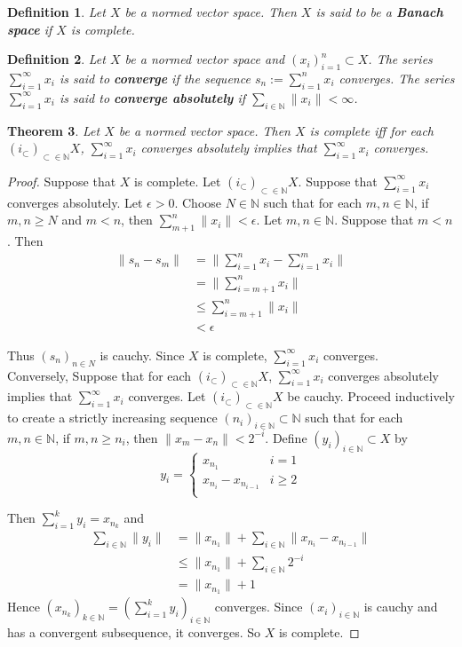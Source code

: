 \documentclass[12pt]{amsart}
\newtheorem{thm}{Theorem}[subsection]
\newtheorem{defn}[thm]{Definition}
\newcommand{\ep}{\epsilon}
\newcommand{\N}{\mathbb{N}}
\newcommand{\seq}[2]{(#1_{#2})_{#2 \in \N}}
\begin{document}
	\begin{defn}
		Let $X$ be a normed vector space. Then $X$ is said to be a \textbf{Banach space} if $X$ is complete.  
	\end{defn}
	
	\begin{defn}
		Let $X$ be a normed vector space and $(x_i)_{i=1}^n \subset X$. The series $\sum_{i =1}^{\infty}x_i$ is said to \textbf{converge} if the sequence $s_n := \sum_{i=1}^n x_i$ converges. The series $\sum_{i =1}^{\infty}x_i$ is said to \textbf{converge absolutely} if $\sum_{i\in \N}\|x_i \|< \infty$.
	\end{defn}
	
	\begin{thm}
		Let $X$ be a normed vector space. Then $X$ is complete iff for each $\seq{i} \subset X$, $\sum_{i =1}^{\infty}x_i$ converges absolutely implies that $\sum_{i=1}^{\infty}x_i$ converges. 
	\end{thm}
	
	\begin{proof}
		Suppose that $X$ is complete. Let $\seq{i} \subset X$. Suppose that $\sum_{i=1}^{\infty}x_i$ converges absolutely. Let $\ep >0$. Choose $N \in \N$ such that for each $m,n \in \N$, if $m, n \geq N$ and $m< n$, then $\sum_{m+1}^n \|x_i \|< \ep$. Let $m, n \in \N$. Suppose that $m<n$. Then 
		\begin{align*}
			\|s_n-s_m \|
			&= \bigg \|\sum_{i=1}^n x_i -\sum_{i=1}^m x_i\bigg \|\\
			&= \bigg\|\sum_{i=m+1}^{n} x_i \bigg \| \\
			& \leq \sum_{i=m+1}^n \|x_i \|\\
			& < \ep
		\end{align*}
		
		Thus $(s_n)_{n \in N}$ is cauchy. Since $X$ is complete, $\sum_{i=1}^{\infty}x_i$ converges. \\
		Conversely, Suppose that for each $\seq{i} \subset X$, $\sum_{i =1}^{\infty}x_i$ converges absolutely implies that $\sum_{i=1}^{\infty}x_i$ converges. Let $\seq{i} \subset X$ be cauchy. Proceed inductively to create a strictly increasing sequence $(n_i)_{i \in \N} \subset \N$ such that for each $m, n \in \N$, if $m,n \geq n_i$, then $ \|x_m-x_n \|< 2^{-i}$. Define $(y_i)_{i \in \N} \subset X$ by 
		\[ y_i = \begin{cases}
			x_{n_1} & i=1 \\
			x_{n_i} - x_{n_{i-1}} & i \geq 2\\
		\end{cases}\]
		
		Then $\sum_{i=1}^k y_i = x_{n_k}$ and 
		\begin{align*}
			\sum_{i \in \N} \|y_i \|
			&= \|x_{n_1} \|+ \sum_{i \in \N} \|x_{n_i}-x_{n_{i-1}} \|\\
			& \leq \|x_{n_1} \|+ \sum_{i \in \N}2^{-i}\\
			& = \|x_{n_1} \|+1
		\end{align*}
		Hence $(x_{n_k})_{k \in \N} = (\sum_{i=1}^k y_i)_{i\in \N}$ converges. Since $(x_i)_{i \in \N}$ is cauchy and has a convergent subsequence, it converges. So $X$ is complete.
	\end{proof}
	
\end{document}
